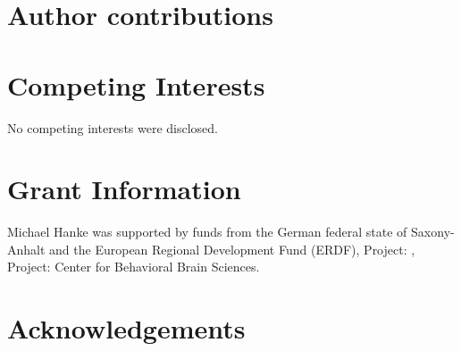 \documentclass[10pt,a4paper,twocolumn]{article}
\begin{document}
\section*{Author contributions}

\section*{Competing Interests}
No competing interests were disclosed.

\section*{Grant Information}

Michael Hanke was supported by funds from the German federal state of
Saxony-Anhalt and the European Regional Development Fund (ERDF), Project: ,
Project: Center for Behavioral Brain Sciences.

\section*{Acknowledgements}

{\small
}
\end{document}
